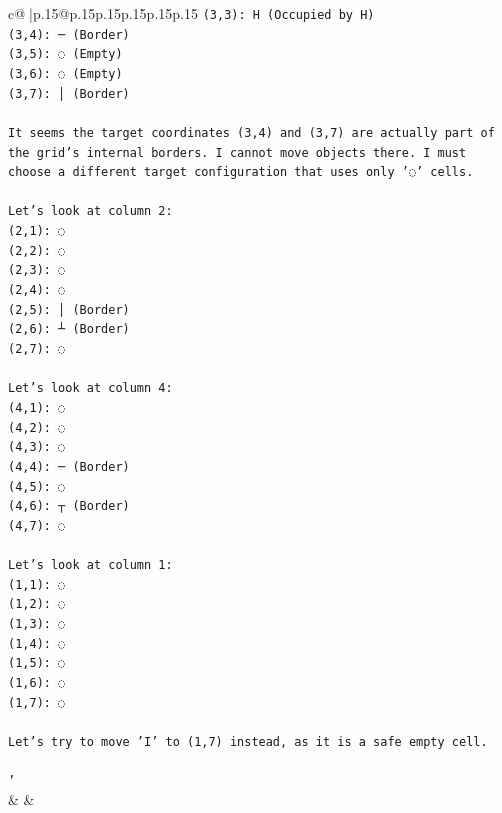 \documentclass{article}
\begin{document}
{\begin{supertabular}{c@{$\;$}|p{.15\linewidth}@{}p{.15\linewidth}p{.15\linewidth}p{.15\linewidth}p{.15\linewidth}p{.15\linewidth}}
{{{\texttt{(3,3): H (Occupied by H)} \\
\texttt{(3,4): ─ (Border)} \\
\texttt{(3,5): ◌ (Empty)} \\
\texttt{(3,6): ◌ (Empty)} \\
\texttt{(3,7): │ (Border)} \\
\\ 
\texttt{It seems the target coordinates (3,4) and (3,7) are actually part of the grid's internal borders. I cannot move objects there. I must choose a different target configuration that uses only '◌' cells.} \\
\\ 
\texttt{Let's look at column 2:} \\
\texttt{(2,1): ◌} \\
\texttt{(2,2): ◌} \\
\texttt{(2,3): ◌} \\
\texttt{(2,4): ◌} \\
\texttt{(2,5): │ (Border)} \\
\texttt{(2,6): ┴ (Border)} \\
\texttt{(2,7): ◌} \\
\\ 
\texttt{Let's look at column 4:} \\
\texttt{(4,1): ◌} \\
\texttt{(4,2): ◌} \\
\texttt{(4,3): ◌} \\
\texttt{(4,4): ─ (Border)} \\
\texttt{(4,5): ◌} \\
\texttt{(4,6): ┬ (Border)} \\
\texttt{(4,7): ◌} \\
\\ 
\texttt{Let's look at column 1:} \\
\texttt{(1,1): ◌} \\
\texttt{(1,2): ◌} \\
\texttt{(1,3): ◌} \\
\texttt{(1,4): ◌} \\
\texttt{(1,5): ◌} \\
\texttt{(1,6): ◌} \\
\texttt{(1,7): ◌} \\
\\ 
\texttt{Let's try to move 'I' to (1,7) instead, as it is a safe empty cell.} \\
\\ 
\texttt{'} \\
            }
        }
    }
    & & \\ \\


\end{supertabular}}
\end{document}
